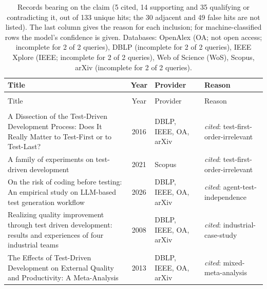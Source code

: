 
\begingroup\footnotesize
\begin{longtable}{@{}%
  >{\raggedright\arraybackslash}p{}c%
  >{\raggedright\arraybackslash}p{}%
  >{\raggedright\arraybackslash}p{}@{}}
\caption{Records bearing on the claim (5 cited, 14 supporting and 35 qualifying or contradicting it, out of 133 unique hits; the 30 adjacent and 49 false hits are not listed). The last column gives the reason for each inclusion; for machine-classified rows the model's confidence is given. Databases: OpenAlex (OA; not open access; incomplete for 2 of 2 queries), DBLP (incomplete for 2 of 2 queries), IEEE Xplore (IEEE; incomplete for 2 of 2 queries), Web of Science (WoS), Scopus, arXiv (incomplete for 2 of 2 queries).}\label{tab:t-tdd}\\
\toprule
Title & Year & Provider & Reason \\
\midrule
\endfirsthead
\multicolumn{4}{@{}l}{\emph{\tablename~\thetable{} (cont.)}}\\
\toprule
Title & Year & Provider & Reason \\
\midrule
\endhead
\midrule \multicolumn{4}{r@{}}{\emph{continued on next page}}\\
\endfoot
\bottomrule
\endlastfoot
A Dissection of the Test-Driven Development Process: Does It Really Matter to Test-First or to Test-Last? & 2016 & DBLP, IEEE, OA, arXiv & \emph{cited}: test-first-order-irrelevant \\
A family of experiments on test-driven development & 2021 & Scopus & \emph{cited}: test-first-order-irrelevant \\
On the risk of coding before testing: An empirical study on LLM-based test generation workflow & 2026 & DBLP, IEEE, OA, arXiv & \emph{cited}: agent-test-independence \\
Realizing quality improvement through test driven development: results and experiences of four industrial teams & 2008 & DBLP, IEEE, OA, arXiv & \emph{cited}: industrial-case-study \\
The Effects of Test-Driven Development on External Quality and Productivity: A Meta-Analysis & 2013 & DBLP, IEEE, OA, arXiv & \emph{cited}: mixed-meta-analysis \\

\end{longtable}
